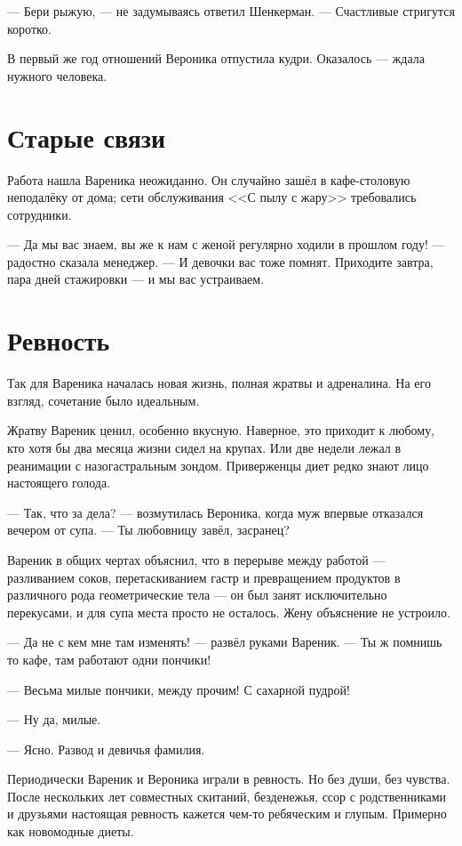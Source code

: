 \documentclass[a4paper,10pt,fleqn]{book}\usepackage{polyglossia}\setdefaultlanguage{english}\setotherlanguage{russian}\defaultfontfeatures{Ligatures=TeX,Mapping=tex-text} \usepackage{xcolor}\definecolor{lightgray}{HTML}{bbbbbb}\color{lightgray}\newcommand{\ml}[3]{\textcolor{black}{#3}}
\begin{document}
--- Бери рыжую, --- не задумываясь ответил Шенкерман.
--- Счастливые стригутся коротко.

В первый же год отношений Вероника отпустила кудри.
Оказалось --- ждала нужного человека.

\section{Старые связи}

Работа нашла Вареника неожиданно.
Он случайно зашёл в кафе-столовую неподалёку от дома;
сети обслуживания <<С пылу с жару>> требовались сотрудники.

--- Да мы вас знаем, вы же к нам с женой регулярно ходили в прошлом году! --- радостно сказала менеджер.
--- И девочки вас тоже помнят.
Приходите завтра, пара дней стажировки --- и мы вас устраиваем.

\section{Ревность}

Так для Вареника началась новая жизнь, полная жратвы и адреналина.
На его взгляд, сочетание было идеальным.

Жратву Вареник ценил, особенно вкусную.
Наверное, это приходит к любому, кто хотя бы два месяца жизни сидел на крупах.
Или две недели лежал в реанимации с назогастральным зондом.
Приверженцы диет редко знают лицо настоящего голода.

--- Так, что за дела? --- возмутилась Вероника, когда муж впервые отказался вечером от супа.
--- Ты любовницу завёл, засранец?

Вареник в общих чертах объяснил, что в перерыве между работой --- разливанием соков, перетаскиванием гастр и превращением продуктов в различного рода геометрические тела --- он был занят исключительно перекусами, и для супа места просто не осталось.
Жену объяснение не устроило.

--- Да не с кем мне там изменять! --- развёл руками Вареник.
--- Ты ж помнишь то кафе, там работают одни пончики!

--- Весьма милые пончики, между прочим!
С сахарной пудрой!

--- Ну да, милые.

--- Ясно.
Развод и девичья фамилия.

Периодически Вареник и Вероника играли в ревность.
Но без души, без чувства.
После нескольких лет совместных скитаний, безденежья, ссор с родственниками и друзьями настоящая ревность кажется чем-то ребяческим и глупым.
Примерно как новомодные диеты.
\end{document}
